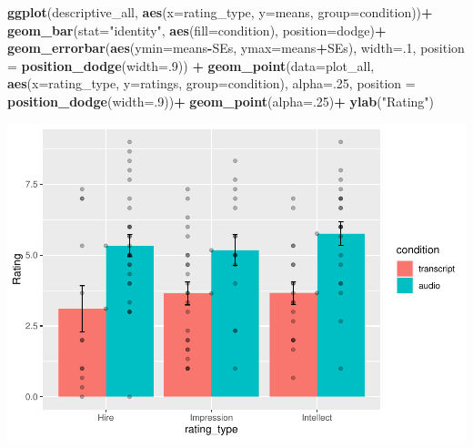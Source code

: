 \documentclass[
]{book}
\newenvironment{Shaded}{\begin{snugshade}}{\end{snugshade}}
\newcommand{\AttributeTok}[1]{\textcolor[rgb]{0.13,0.29,0.53}{#1}}
\newcommand{\DecValTok}[1]{\textcolor[rgb]{0.00,0.00,0.81}{#1}}
\newcommand{\FunctionTok}[1]{\textcolor[rgb]{0.13,0.29,0.53}{\textbf{#1}}}
\newcommand{\NormalTok}[1]{#1}
\newcommand{\SpecialCharTok}[1]{\textcolor[rgb]{0.81,0.36,0.00}{\textbf{#1}}}
\newcommand{\StringTok}[1]{\textcolor[rgb]{0.31,0.60,0.02}{#1}}
\begin{document}
\begin{Shaded}
\begin{Highlighting}[]
\FunctionTok{ggplot}\NormalTok{(descriptive\_all, }\FunctionTok{aes}\NormalTok{(}\AttributeTok{x=}\NormalTok{rating\_type, }\AttributeTok{y=}\NormalTok{means, }\AttributeTok{group=}\NormalTok{condition))}\SpecialCharTok{+} 
  \FunctionTok{geom\_bar}\NormalTok{(}\AttributeTok{stat=}\StringTok{"identity"}\NormalTok{, }\FunctionTok{aes}\NormalTok{(}\AttributeTok{fill=}\NormalTok{condition), }\AttributeTok{position=}\StringTok{\textquotesingle{}dodge\textquotesingle{}}\NormalTok{)}\SpecialCharTok{+} 
  \FunctionTok{geom\_errorbar}\NormalTok{(}\FunctionTok{aes}\NormalTok{(}\AttributeTok{ymin=}\NormalTok{means}\SpecialCharTok{{-}}\NormalTok{SEs,               }
                    \AttributeTok{ymax=}\NormalTok{means}\SpecialCharTok{+}\NormalTok{SEs), }
                \AttributeTok{width=}\NormalTok{.}\DecValTok{1}\NormalTok{, }
                \AttributeTok{position =} \FunctionTok{position\_dodge}\NormalTok{(}\AttributeTok{width=}\NormalTok{.}\DecValTok{9}\NormalTok{)) }\SpecialCharTok{+}
  \FunctionTok{geom\_point}\NormalTok{(}\AttributeTok{data=}\NormalTok{plot\_all, }\FunctionTok{aes}\NormalTok{(}\AttributeTok{x=}\NormalTok{rating\_type, }
                                \AttributeTok{y=}\NormalTok{ratings, }
                                \AttributeTok{group=}\NormalTok{condition), }
             \AttributeTok{alpha=}\NormalTok{.}\DecValTok{25}\NormalTok{, }
             \AttributeTok{position =} \FunctionTok{position\_dodge}\NormalTok{(}\AttributeTok{width=}\NormalTok{.}\DecValTok{9}\NormalTok{))}\SpecialCharTok{+}
  \FunctionTok{geom\_point}\NormalTok{(}\AttributeTok{alpha=}\NormalTok{.}\DecValTok{25}\NormalTok{)}\SpecialCharTok{+}
  \FunctionTok{ylab}\NormalTok{(}\StringTok{"Rating"}\NormalTok{)}
\end{Highlighting}
\end{Shaded}

\includegraphics{Statistics_Lab_files/figure-latex/unnamed-chunk-226-1.pdf}
\end{document}
